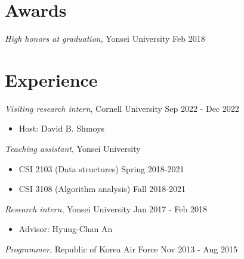 \documentclass[margin, 10pt]{res} %
\begin{document}
\begin{resume}

\section{Awards}
\textsl{High honors at graduation}, Yonsei University \hfill Feb 2018

\section{Experience}
\textsl{Visiting research intern}, Cornell University \hfill Sep 2022 - Dec 2022
\begin{itemize} \itemsep -2pt %
\item[] Host: David B. Shmoys
\end{itemize}

\textsl{Teaching assistant}, Yonsei University
\begin{itemize} \itemsep -2pt %
\item[] CSI 2103 (Data structures) \hfill Spring 2018-2021
\item[] CSI 3108 (Algorithm analysis) \hfill Fall 2018-2021
\end{itemize}

\textsl{Research intern}, Yonsei University \hfill Jan 2017 - Feb 2018
\begin{itemize} \itemsep -2pt %
\item[] Advisor: Hyung-Chan An
\end{itemize}

\textsl{Programmer}, Republic of Korea Air Force \hfill Nov 2013 - Aug 2015




\end{resume}
\end{document}
